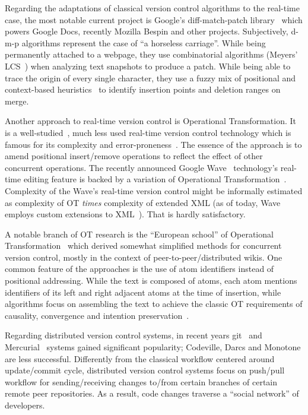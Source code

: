 \documentclass[twocolumn]{article}
\begin{document}
Regarding the adaptations of classical version control algorithms to the real-time case, the most notable current project is Google's diff-match-patch library~\cite{dmp} which powers Google Docs, recently Mozilla Bespin and other projects. Subjectively, d-m-p algorithms represent the case of ``a horseless carriage''. While being permanently attached to a webpage, they use combinatorial algorithms (Meyers' LCS~\cite{meyers}) when analyzing text snapshots to produce a patch. While being able to trace the origin of every single character, they use a fuzzy mix of positional and context-based heuristics~\cite{fraser-merge} to identify insertion points and deletion ranges on merge.

Another approach to real-time version control is Operational Transformation. It is a well-studied~\cite{ot1,ot2,ot3}, much less used real-time version control technology which is famous for its complexity and error-proneness~\cite{ot-mistakes}. The essence of the approach is to amend positional insert/remove operations to reflect the effect of other concurrent operations. The recently announced Google Wave~\cite{wave} technology's real-time editing feature is backed by a variation of Operational Transformation~\cite{waveot}. Complexity of the Wave's real-time version control might be informally estimated as complexity of OT \emph{times} complexity of extended XML (as of today, Wave employs custom extensions to XML~\cite{wavexml}). That is hardly satisfactory.

A notable branch of OT research is the ``European school'' of Operational Transformation~\cite{woot,inria,etc} which derived somewhat simplified methods for concurrent version control, mostly in the context of peer-to-peer/distributed wikis. One common feature of the approaches is the use of atom identifiers instead of positional addressing. While the text is composed of atoms, each atom mentions identifiers of its left and right adjacent atoms at the time of insertion, while algorithms focus on assembling the text to achieve the classic OT requirements of causality, convergence and intention preservation~\cite{ot}.

Regarding distributed version control systems, in recent years git~\cite{git} and Mercurial~\cite{mercurial} systems gained significant popularity; Codeville, Darcs and Monotone are less successful. Differently from the classical workflow centered around update/commit cycle, distributed version control systems focus on push/pull workflow for sending/receiving changes to/from certain branches of certain remote peer repositories. As a result, code changes traverse a ``social network'' of developers.
\end{document}
